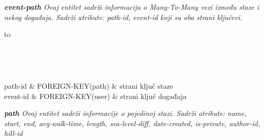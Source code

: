 			
			\textit{\textbf{event-path} Ovaj entitet sadrži informaciju o Many-To-Many vezi između staze i nekog događaja. Sadrži atribute: path-id, event-id koji su oba strani ključevi.}
			
			\begin{longtabu} to \textwidth {|X[6, l]|X[6, l]|X[20, l]|}
				
				\hline {}	 \\[3pt] \hline
				\endfirsthead
				
				\hline {}	 \\[3pt] \hline
				\endhead
				
				\hline 
				\endlastfoot
				
				path-id & FOREIGN-KEY(path)	&  	strani ključ staze 	\\ \hline
				event-id	& FOREIGN-KEY(user) &  strani ključ događaja 	\\ \hline 
				
				
			\end{longtabu}


			\textit{\textbf{path} Ovaj entitet sadrži informacije o pojedinoj stazi. Sadrži atribute: name, start, end, avg-walk-time, length, sea-level-diff, date-created, is-private, author-id, hill-id}
			
